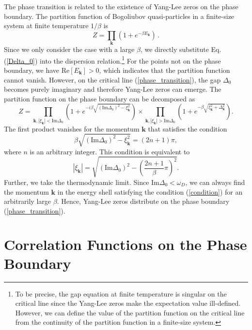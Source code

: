 \documentclass[aps,onecolumn,nofootinbib,superscriptaddress,notitlepage,longbibliography]{revtex4-1}
\begin{document}
The phase transition is related to the existence of Yang-Lee zeros on the phase boundary. The partition function of Bogoliubov quasi-particles in a finite-size system at finite temperature $1/\beta$ is
\begin{equation}
  Z = \prod_{\bm{k}} (1 + e^{-\beta E_{\bm{k}}})\,.
\end{equation}
 Since we only consider the case with a large $\beta$, we directly substitute Eq. (\ref{Delta_0}) into the dispersion relation.\footnote{To be precise, the gap equation at finite temperature is singular on the critical line since the Yang-Lee zeros make the expectation value ill-defined. However, we can define the value of the partition function on the critical line from the continuity of the partition function in a finite-size system.} For the points not on the phase boundary, we have $\text{Re}
 [E_{\bm{k}}] > 0$, which indicates that the
 partition function cannot vanish. However, on the critical line (\ref{phase_transition}), the gap $\Delta_0$ becomes purely imaginary and therefore Yang-Lee zeros can emerge. The partition function on the phase boundary can be decomposed as
\begin{equation}
  Z = \prod_{\bm{k},|\xi_{\bm{k}}|<\text{Im}\Delta_0} \left( 1 + e^{- i \beta \sqrt{\left( \text{Im}\Delta_0 \right)^2 - \xi_{\bm{k}}^2}} \right)\times \prod_{\bm{k},|\xi_{\bm{k}}|>\text{Im}\Delta_0}\left( 1 + e^{- \beta \sqrt{\xi_{\bm{k}}^2 +\Delta_{\bm{k}}^2 }} \right).
\end{equation}
The first product vanishes for the momentum $\bm{k}$ that satisfies the condition
\begin{equation}
  \beta \sqrt{\left( \text{Im} \Delta_0 \right)^2 - \xi_{\bm{k}}^2} = (2n + 1) \pi,
\end{equation}
where $n$ is an arbitrary integer. This condition is equivalent to
\begin{equation}
 |\xi_{\bm{k}}| = \sqrt{\left( \text{Im} \Delta_0
  \right)^2 - \left( \frac{2 n + 1}{\beta} \pi \right)^2}.
  \label{condition}
\end{equation}
 Further, we take the thermodynamic limit. Since $\text{Im}\Delta_0<\omega_D$, we can always find the momentum $\bm{k}$ in the energy shell satisfying the condition (\ref{condition}) for an arbitrarily large $\beta$. Hence, Yang-Lee zeros distribute on the phase boundary (\ref{phase_transition}). 

\section{Correlation Functions on the Phase Boundary}\label{SectionOn}
\end{document}
